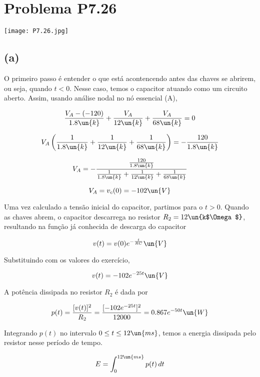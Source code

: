 
\section*{Problema P7.26}

\renewcommand*\thesection{7.26}

\begin{center}
    \texttt{[image: P7.26.jpg]}
\end{center}

\subsection*{(a)}

O primeiro passo é entender o que está acontencendo antes das chaves se abrirem, ou seja, quando $t<0$. Nesse caso, temos o capacitor atuando como um
circuito aberto. Assim, usando análise nodal no nó essencial (A),

\[ \frac{V_A - (-120)}{1.8\un{k}} + \frac{V_A}{12\un{k}} + \frac{V_A}{68\un{k}} = 0 \]

\[ V_A\left(\frac{1}{1.8\un{k}} + \frac{1}{12\un{k}} + \frac{1}{68\un{k}} \right) = - \frac{120}{1.8\un{k}} \]

\[ V_A = - \frac{\frac{120}{1.8\un{k}}}{\frac{1}{1.8\un{k}} + \frac{1}{12\un{k}} + \frac{1}{68\un{k}}}  \]

\[ V_A = v_c(0) = -102 \un{V} \]

Uma vez calculado a tensão inicial do capacitor, partimos para o $t>0$. Quando as chaves abrem, o capacitor descarrega no resistor $R_2 = 12 \un{k$\Omega$}$, resultando
na função já conhecida de descarga do capacitor 

\begin{equation}\label{eq:7.26.1}
    v(t) = v(0)e^{-\frac{t}{RC}} \un{V}
\end{equation}

Substituindo com os valores do exercício,   

\[ v(t) = -102e^{-25t} \un{V} \]

A potência dissipada no resistor $R_2$ é dada por 

\[ p(t) = \frac{[v(t)]^2}{R_2} = \frac{[-102e^{-25t}]^2}{12000} = 0.867e^{-50t} \un{W} \]

Integrando $p(t)$ no intervalo $0 \leq t \leq 12 \un{ms}$, temos a energia dissipada pelo resistor nesse período de tempo.

\[ E = \int_{0}^{12 \un{ms}} p(t) \,dt \]

